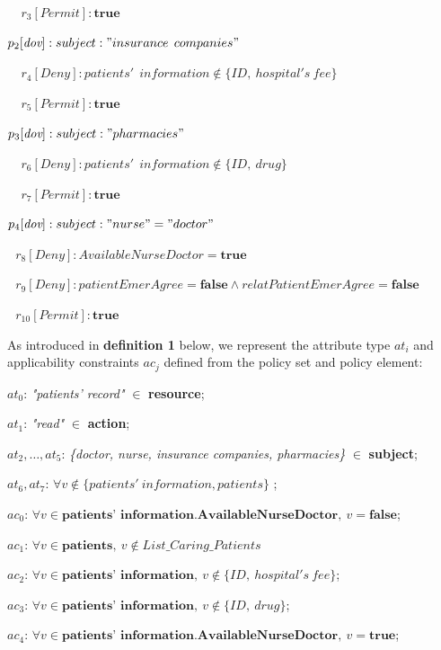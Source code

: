 \documentclass[conference]{IEEEtran}
\begin{document}
$\:\:\:\:\: r_3[\textit{Permit}] : \textbf{true} $

$p_2[\textit{dov}] : subject : "insurance \:\: companies" $

$\:\:\:\:\: r_4[\textit{Deny}] : patients' \:\: information \notin \{ID,\:hospital's \: fee\}$

$\:\:\:\:\: r_5[\textit{Permit}] : \textbf{true} $

$p_3[\textit{dov}] : subject :  "pharmacies"$

$\:\:\:\:\: r_6[\textit{Deny}] : patients' \:\: information \notin \{ID,\:drug\}$

$\:\:\:\:\: r_7[\textit{Permit}] : \textbf{true} $

$p_4[\textit{dov}] : subject : "nurse" = "doctor"$

$\:\:\: r_{8}[\textit{Deny}] : AvailableNurseDoctor = \textbf{true}$

$\:\:\: r_{9}[\textit{Deny}] : patientEmerAgree = \textbf{false} \wedge relatPatientEmerAgree = \textbf{false}$

$\:\:\: r_{10}[\textit{Permit}] : \textbf{true} $

As introduced in \textbf{definition 1} below, we represent the attribute type $at_i$ and applicability constraints $ac_j$ defined from the policy set and policy element:

\textit{$at_0$}: \textit{"patients' record"} $ \in $ \textbf{resource};%

\textit{$at_1$}: \textit{"read"} $ \in $ \textbf{action};

\textit{$at_2, \dots, at_5$}: \textit{\{doctor, nurse, insurance companies, pharmacies\}} $ \in $ \textbf{subject};

\textit{$at_6, at_7$}: $ \forall \textit{v} \notin \{patients' \:information, patients\}$ ;

\textit{$ac_0$}: $ \forall \textit{v} \in \textbf{patients' information.AvailableNurseDoctor}, \: \textit{v} = \textbf{false}$;

\textit{$ac_1$}: $ \forall \textit{v} \in \textbf{patients}, \: \textit{v}  \notin List\_Caring\_Patients$

\textit{$ac_2$}: $ \forall \textit{v} \in \textbf{patients' information}, \: \textit{v} \notin \{ID,\:hospital's \: fee\} $;

\textit{$ac_3$}: $ \forall \textit{v} \in \textbf{patients' information}, \: \textit{v} \notin \{ID,\:drug\} $;

\textit{$ac_4$}: $ \forall \textit{v} \in \textbf{patients' information.AvailableNurseDoctor}, \: \textit{v} = \textbf{true}$;
\end{document}
